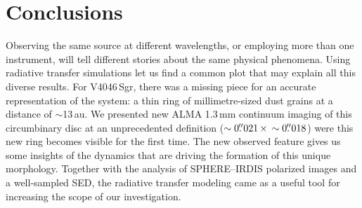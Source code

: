\documentclass[fleqn,usenatbib,useAMS]{mnras}
\begin{document}
\section{Conclusions} \label{sec:Conclusions}

Observing the same source at different wavelengths, or employing more than one instrument, will tell different stories about the same physical phenomena. Using radiative transfer simulations let us find a common plot that may explain all this diverse results. For V4046\,Sgr, there was a missing piece for an accurate representation of the system: a thin ring of millimetre-sized dust grains at a distance of $\sim$13\,au. We presented new ALMA 1.3\,mm continuum imaging of this circumbinary disc at an unprecedented definition ($\sim0\hbox{$.\!\!^{\prime\prime}$}021 \, \times \, \sim0\hbox{$.\!\!^{\prime\prime}$}018$) were this new ring becomes visible for the first time. The new observed feature gives us some insights of the dynamics that are driving the formation of this unique morphology. Together with the analysis of SPHERE--IRDIS polarized images and a well-sampled SED, the radiative transfer modeling came as a useful tool for increasing the scope of our investigation.
\end{document}
